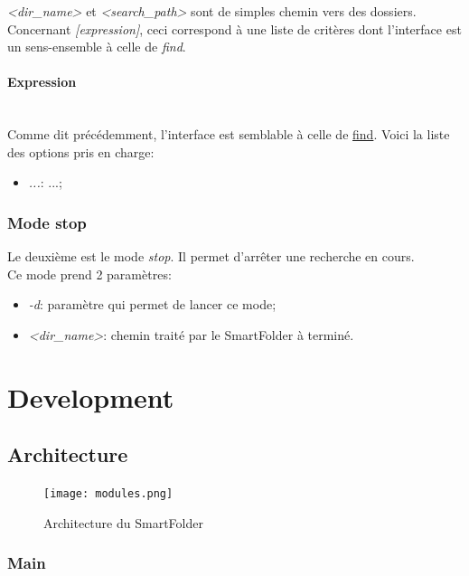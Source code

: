 \documentclass[11pt, a4paper]{article}
\newcommand{\paragraphnl}[1]{\paragraph{#1}\mbox{}\\}
\begin{document}
\textit{<dir\_name>} et \textit{<search\_path>} sont de simples chemin vers des dossiers.
Concernant \textit{[expression]}, ceci correspond à une liste de critères dont l'interface est un sens-ensemble à celle de \textit{find}.

\paragraphnl{Expression}
Comme dit précédemment, l'interface est semblable à celle de \href{https://linux.die.net/man/1/find}{find}.
Voici la liste des options pris en charge:

\begin{itemize}
    \item \textit{...}: ...;
\end{itemize}

\subsubsection{Mode stop}
Le deuxième est le mode \textit{stop}.
Il permet d'arrêter une recherche en cours. \\

Ce mode prend 2 paramètres:
\begin{itemize}
    \item \textit{-d}: paramètre qui permet de lancer ce mode;
    \item \textit{<dir\_name>}: chemin traité par le SmartFolder à terminé.
\end{itemize}

\newpage

\section{Development}
\subsection{Architecture}

\begin{figure}[H]
    \begin{center}
        \texttt{[image: modules.png]}
    \end{center}
    \caption{Architecture du SmartFolder}
    \label{Architecture du SmartFolder}
\end{figure}

\subsubsection{Main}
\end{document}
